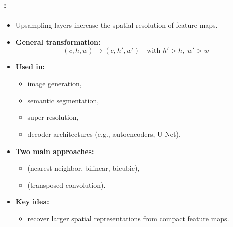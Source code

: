 \documentclass[xcolor=table]{beamer}
\begin{document}
\begin{frame}
	\frametitle{\insertshortsubtitle: \insertsection}
	\framesubtitle{\insertsubsection}
	
	\begin{itemize}
		
		\item Upsampling layers increase the spatial resolution of feature maps.
		
		\item \textbf{General transformation:}
		\[
		(c, h, w) \rightarrow (c, h', w')
		\quad \text{with } h' > h,\; w' > w
		\]
		
		\item \textbf{Used in:}
		\begin{itemize}
			\item image generation,
			\item semantic segmentation,
			\item super-resolution,
			\item decoder architectures (e.g., autoencoders, U-Net).
		\end{itemize}
		
		\item \textbf{Two main approaches:}
		\begin{itemize}
			\item {} (nearest-neighbor, bilinear, bicubic),
			\item {} (transposed convolution).
		\end{itemize}
		
		\item \textbf{Key idea:}
		\begin{itemize}
			\item recover larger spatial representations from compact feature maps.
		\end{itemize}
		
	\end{itemize}
	
\end{frame}
\end{document}
